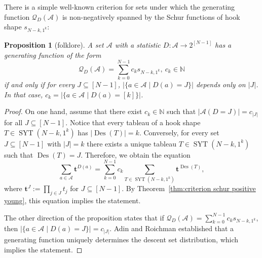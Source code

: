 \documentclass[11pt]{article}
\newtheorem{proposition}[theo]{Proposition}
\theoremstyle{definition}
\numberwithin{equation}{section}
\newcommand{\Des}{\operatorname{Des}}
\newcommand{\Syt}{\operatorname{SYT}}
\newcommand{\NN}{\mathbb{N}}
\newcommand{\Q}{\mathcal{Q}}
\newcommand{\A}{\mathcal{A}}
\begin{document}
There is a simple well-known criterion for sets under which the generating function $\Q_{D}(\A)$ is non-negatively spanned by the Schur functions of hook shape $s_{N-k,1^k}$:

\begin{proposition}[folklore]
\label{prop:hook schur positive}
    A set $\A$ with a statistic $D:\A \to 2^{[N-1]}$ has a generating function of the form
    \[
        \Q_{D}(\A) = \sum_{k=0}^{N-1} c_k s_{N-k,1^k},\ c_k \in \NN
    \]
    if and only if for every $J \subseteq [N-1]$, $|\{a \in \A \mid D(a) = J\}|$ depends only on $|J|$. In that case, $c_k = |\{a \in \A \mid D(a) = [k]\}|$.
\end{proposition}

\begin{proof}
    On one hand, assume that there exist $c_k \in \NN$ such that $|\A(D=J)| = c_{|J|}$ for all $J \subseteq [N-1]$. Notice that every tableau of a hook shape $T \in \Syt(N-k,1^k)$ has $|\Des(T)| = k$. Conversely, for every set $J \subseteq [N-1]$ with $|J| = k$ there exists a unique tableau $T \in \Syt(N-k,1^k)$ such that $\Des(T) = J$. Therefore, we obtain the equation
    \[
        \sum_{a \in \A} \boldsymbol{t}^{D(a)} = \sum_{k=0}^{N-1} c_k \sum_{T \in \Syt(N-k,1^k)} \boldsymbol{t}^{\Des(T)},
    \]
    where $\boldsymbol{t}^J := \prod_{j \in J} t_j$ for $J \subseteq [N-1]$.
    By Theorem~\ref{thm:criterion schur positive young}, this equation implies the statement.

    The other direction of the proposition states that if $\Q_{D}(\A) = \sum_{k=0}^{N-1} c_k s_{N-k,1^k}$, then $|\{a \in \A \mid D(a) = J\}| = c_{|J|}$. Adin and Roichman \cite[Corollary 8.1]{adin_roichman_fine_set} established that a generating function uniquely determines the descent set distribution, which implies the statement.
\end{proof}
\end{document}
